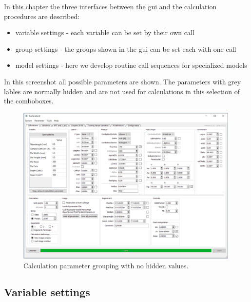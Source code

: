 \documentclass[11pt]{article} %
\begin{document}
In this chapter the three interfaces between the gui and the calculation procedures are described:
\begin{itemize}\itemsep0pt
\item variable settings - each variable can be set by their own call
\item group settings - the groups shown in the gui can be set each with one call
\item model settings - here we develop routine call sequences for specialized models
\end{itemize}
In this screenshot all possible parameters are shown. The parameters with grey lables are normally hidden and are not used for calculations in this selection of the comboboxes.
\begin{figure}[H]
 \centering
 \includegraphics[width=0.99\textwidth]{gui-calculations-nohidden.png}
 \caption{Calculation parameter grouping with no hidden values.}
\end{figure}

\subsection{Variable settings}
\end{document}
